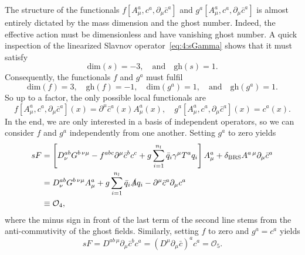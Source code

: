 The structure of the functionals $f[A^a_\mu, c^a, \partial_\mu \bar{c}^a]$ and $g^a [A^a_\mu, c^a, \partial_\mu \bar{c}^a]$ is almost entirely dictated by the mass dimension and the ghost number. Indeed, the effective action must be dimensionless and have vanishing ghost number. A quick inspection of the linearized Slavnov operator~\eqref{eq:4:sGamma} shows that it must satisfy
\begin{equation}
\text{dim}(s) = -3, \quad \text{and} \quad  \text{gh}(s) = 1.
\end{equation}
Consequently, the functionals $f$ and $g^a$ must fulfil
\begin{equation}
\text{dim}(f) = 3, \quad \text{gh}(f) = -1, \quad \text{dim} (g^a) = 1, \quad \text{and} \quad \text{gh} (g^a) = 1.
\end{equation}
So up to a factor, the only possible local functionals are
\begin{equation}
f[A^a_\mu, c^a, \partial_\mu \bar{c}^a](x) = \partial^\mu \bar{c}^a(x) A^a_\mu(x), \quad g^a[A^a_\mu, c^a, \partial_\mu \bar{c}^a](x) = c^a(x).
\end{equation}
In the end, we are only interested in a basis of independent operators, so we can consider $f$ and $g^a$ independently from one another. Setting $g^a$ to zero yields
\begin{equation}
\begin{split}
s F &= \left[ D^{ab}_\nu G^{b\, \nu \mu} - f^{abc} \partial^\mu \bar{c}^b c^c + g \sum_{i = 1}^{n_l} \bar{q}_i \gamma^\mu T^a q_i \right] A^{a}_\mu + \delta_{\text{BRS}} A^{a\, \mu} \partial_\mu \bar{c}^a \\
& = D^{ab}_\nu G^{b\, \nu \mu} A^a_\mu + g \sum_{i = 1}^{n_l} \bar{q}_i \slashed{A} q_i - \partial^\mu \bar{c}^a \partial_\mu c^a \\
& \equiv \mathcal{O}_4,
\end{split}
\end{equation}
where the minus sign in front of the last term of the second line stems from the anti-commutivity of the ghost fields. Similarly, setting $f$ to zero and $g^a = c^a$ yields
\begin{equation}
s F = D^{ab\, \mu} \partial_\mu \bar{c}^b c^a = (D^\mu \partial_\mu \bar{c})^a c^a = \mathcal{O}_5.
\end{equation}

